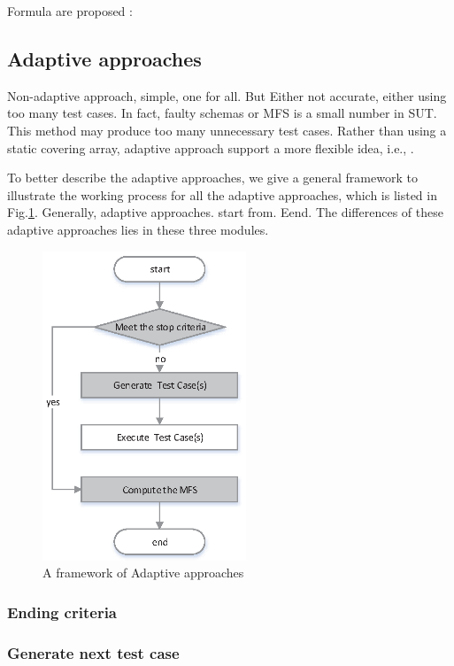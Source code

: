 \documentclass[10pt,journal,cspaper,compsoc]{IEEEtran}
\begin{document}
Formula are proposed :




\subsection{Adaptive approaches}
Non-adaptive approach, simple, one for all. But Either not accurate, either using too many test cases. In fact, faulty schemas or MFS is a small number in SUT. This method may produce too many unnecessary test cases. Rather than using a static covering array, adaptive approach support a more flexible idea, i.e., .

To better describe the adaptive approaches, we give a general framework to illustrate the working process for all the adaptive approaches, which is listed in Fig.\ref{figadaptive}. Generally, adaptive approaches. start from. Eend. The differences of these adaptive approaches lies in these three modules.


\begin{figure}
 \centering
 \includegraphics[width=2.4in]{adaptive-approach.eps}
 \caption{A framework of Adaptive approaches}
 \label{figadaptive}
\end{figure}


\subsubsection{Ending criteria}

\subsubsection{Generate next test case}
\end{document}
